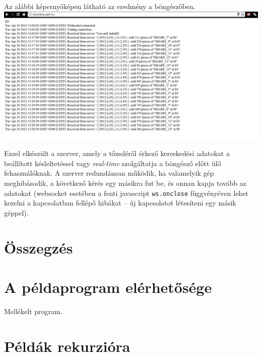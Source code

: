\documentclass[12pt, a4paper, oneside]{book}
\begin{document}
Az alábbi képernyőképen látható az eredmény a böngészőben.\\

\includegraphics[scale=0.33]{fig/Browser.png}

Ezzel elkészült a szerver, amely a tőzsdéről érkező kereskedési adatokat a
beállított késleltetéssel vagy \emph{real-time} szolgáltatja a böngésző előtt
ülő fehasználóknak. A szerver redundánsan működik, ha valamelyik gép
meghibásodik, a következő kérés egy másikra fut be, és onnan kapja tovább az
adatokat (websocket esetében a fenti javascript \texttt{ws.onclose}
függvényéven lehet kezelni a kapcsolatban fellépő hibákat -- új kapcsolatot
létesíteni egy másik géppel).


\chapter{Összegzés}

\appendix
\chapter{A példaprogram elérhetősége}
Mellékelt program.
\chapter{Példák rekurzióra}
\end{document}
